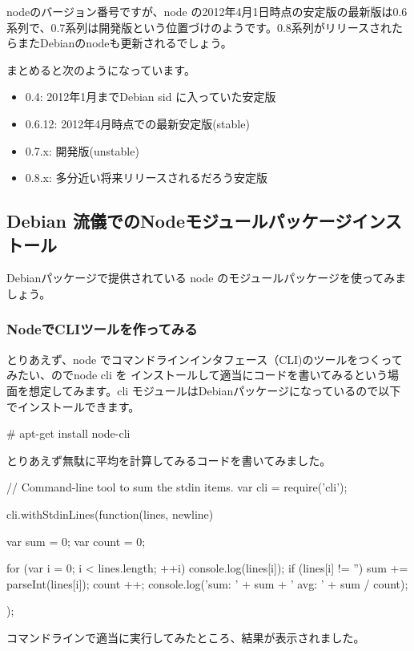 \documentclass[mingoth,a4paper]{jsarticle}
\begin{document}
nodeのバージョン番号ですが、node の2012年4月1日時点の安定版の最新版は0.6
系列で、0.7系列は開発版という位置づけのようです。0.8系列がリリースされた
らまたDebianのnodeも更新されるでしょう。

まとめると次のようになっています。
\begin{itemize}
 \item 0.4: 2012年1月までDebian sid に入っていた安定版
 \item 0.6.12: 2012年4月時点での最新安定版(stable)
 \item 0.7.x: 開発版(unstable)
 \item 0.8.x: 多分近い将来リリースされるだろう安定版
\end{itemize}

\subsection{Debian 流儀でのNodeモジュールパッケージインストール}

Debianパッケージで提供されている node のモジュールパッケージを使ってみましょう。

\subsubsection{NodeでCLIツールを作ってみる}

とりあえず、node でコマンドラインインタフェース（CLI)のツールをつくってみたい、のでnode cli を
インストールして適当にコードを書いてみるという場面を想定してみます。cli
モジュールはDebianパッケージになっているので以下でインストールできます。

\begin{commandline}
# apt-get install node-cli
\end{commandline}

とりあえず無駄に平均を計算してみるコードを書いてみました。

\begin{commandline}
// Command-line tool to sum the stdin items.
var cli = require('cli');

cli.withStdinLines(function(lines, newline) {
    var sum = 0;
    var count = 0;

    for (var i = 0; i < lines.length; ++i) {
	console.log(lines[i]);
	if (lines[i] != '') {
	    sum += parseInt(lines[i]);
	    count ++;
	}
    }
    console.log('sum: ' + sum + ' avg: ' + sum / count);
});
\end{commandline}

コマンドラインで適当に実行してみたところ、結果が表示されました。
\end{document}
